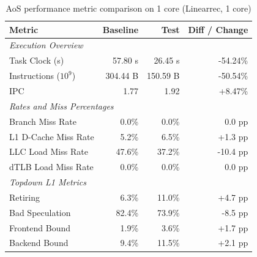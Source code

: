 \documentclass[leqno,11pt]{article}
\begin{document}
        \begin{table}[htbp]
      \centering
      \caption{AoS performance metric comparison on 1 core (Linearrec, 1 core)}
      \label{tab:perf_comparison_aos_linearrec_1core}
      \begin{tabular}{lrrr}
        \toprule
        \textbf{Metric} & \textbf{Baseline} & \textbf{Test} & \textbf{Diff / Change} \\
        \midrule
        \multicolumn{4}{l}{\textit{Execution Overview}} \\
        \quad Task Clock (s)           & 57.80 s   & 26.45 s   & -54.24\%   \\
        \quad Instructions ($10^9$)    & 304.44 B  & 150.59 B  & -50.54\%   \\
        \quad IPC                      & 1.77       & 1.92       & +8.47\%    \\
        \midrule
        \multicolumn{4}{l}{\textit{Rates and Miss Percentages}} \\
        \quad Branch Miss Rate         & 0.0\%      & 0.0\%      & 0.0 pp     \\
        \quad L1 D-Cache Miss Rate     & 5.2\%      & 6.5\%      & +1.3 pp    \\
        \quad LLC Load Miss Rate       & 47.6\%     & 37.2\%     & -10.4 pp    \\
        \quad dTLB Load Miss Rate      & 0.0\%      & 0.0\%      & 0.0 pp     \\
        \midrule
        \multicolumn{4}{l}{\textit{Topdown L1 Metrics}} \\
        \quad Retiring                 & 6.3\%      & 11.0\%      & +4.7 pp    \\
        \quad Bad Speculation          & 82.4\%     & 73.9\%     & -8.5 pp   \\
        \quad Frontend Bound           & 1.9\%      & 3.6\%      & +1.7 pp    \\
        \quad Backend Bound            & 9.4\%      & 11.5\%      & +2.1 pp    \\
        \bottomrule
      \end{tabular}
    \end{table}
\end{document}
